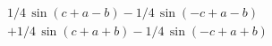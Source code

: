 \begin{multline*}
1/4\,\sin \left( c+a-b \right) -1/4\,\sin \left( -c+a-b \right) \\ 
+1/4\,\sin \left( c+a+b \right)  -1/4\,\sin \left( -c+a+b \right)
\end{multline*}
